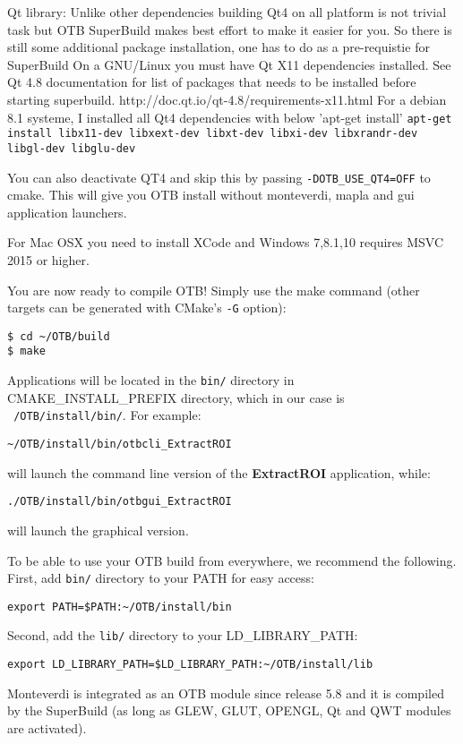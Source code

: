 Qt library: Unlike other dependencies building Qt4 on all platform is not trivial task but
OTB SuperBuild makes best effort to make it easier for you. So there is still
some additional package installation, one has to do as a pre-requistie for SuperBuild
On a GNU/Linux you must have Qt X11 dependencies installed.
See Qt 4.8 documentation for list of packages that needs to be installed
before starting superbuild. http://doc.qt.io/qt-4.8/requirements-x11.html
For a debian 8.1 systeme, I installed all Qt4 dependencies with below 'apt-get install'
\texttt{apt-get install libx11-dev libxext-dev libxt-dev libxi-dev libxrandr-dev libgl-dev libglu-dev}

You can also deactivate QT4 and skip this by passing \texttt{-DOTB\_USE\_QT4=OFF} to cmake.
This will give you OTB install without monteverdi, mapla and gui application launchers.

For Mac OSX you need to install XCode and Windows 7,8.1,10 requires MSVC 2015 or higher.

You are now ready to compile OTB!
Simply use the make command (other targets can be generated with CMake's \texttt{-G} option):
\begin{verbatim}
$ cd ~/OTB/build
$ make
\end{verbatim}

Applications will be located in the \texttt{bin/} directory
in CMAKE\_INSTALL\_PREFIX
directory, which in our case is \texttt{~/OTB/install/bin/}. For example:
\begin{verbatim}
~/OTB/install/bin/otbcli_ExtractROI
\end{verbatim}
will launch the command line version of the \textbf{ExtractROI} application,
while:
\begin{verbatim}
./OTB/install/bin/otbgui_ExtractROI
\end{verbatim}
will launch the graphical version.

To be able to use your OTB build from everywhere, we recommend the following.
First, add \texttt{bin/} directory to your PATH for easy access:
\begin{verbatim}
export PATH=$PATH:~/OTB/install/bin
\end{verbatim}

Second, add the \texttt{lib/} directory to your LD\_LIBRARY\_PATH:
\begin{verbatim}
export LD_LIBRARY_PATH=$LD_LIBRARY_PATH:~/OTB/install/lib
\end{verbatim}

Monteverdi is integrated as an OTB module since release 5.8 and it is compiled
by the SuperBuild (as long as GLEW, GLUT, OPENGL, Qt and QWT modules are
activated).

